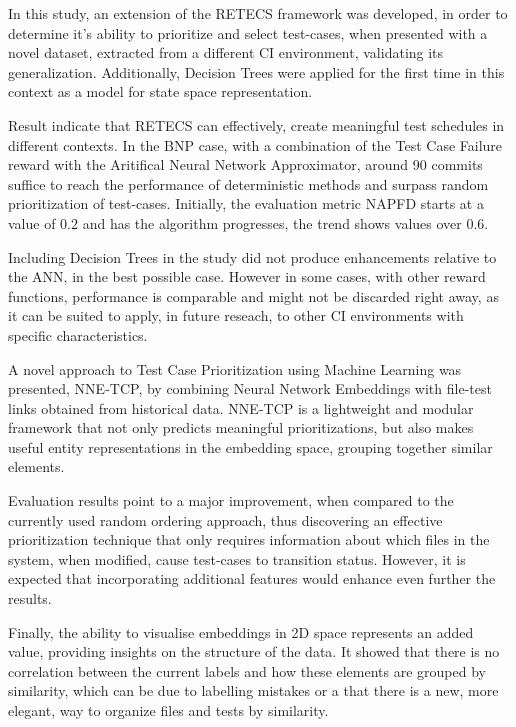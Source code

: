 In this study, an extension of the RETECS framework was developed, in order to determine it's ability to prioritize and select test-cases, when presented with a novel dataset, extracted from a different CI environment, validating its generalization. Additionally, Decision Trees were applied for the first time in this context as a model for state space representation. 
\par Result indicate that RETECS can effectively, create meaningful test schedules in different contexts. In the BNP case, with a combination of the Test Case Failure reward with the Aritifical Neural Network Approximator, around 90 commits suffice to reach the performance of deterministic methods and surpass random prioritization of test-cases. Initially, the evaluation metric NAPFD starts at a value of $0.2$ and has the algorithm progresses, the trend shows values over $0.6$. 
\par Including Decision Trees in the study did not produce enhancements relative to the ANN, in the best possible case. However in some cases, with other reward functions, performance is comparable and might not be discarded right away, as it can be suited to apply, in future reseach, to other CI environments with specific characteristics.
\par A novel approach to Test Case Prioritization using Machine Learning was presented, NNE-TCP, by combining Neural Network Embeddings with file-test links obtained from historical data. NNE-TCP is a lightweight and modular framework that not only predicts meaningful prioritizations, but also makes useful entity representations in the embedding space, grouping together similar elements.
\par Evaluation results point to a major improvement, when compared to the currently used random ordering approach, thus discovering an effective prioritization technique that only requires information about which files in the system, when modified, cause test-cases to transition status. However, it is expected that incorporating additional features would enhance even further the results. 
\par Finally, the ability to visualise embeddings in 2D space represents an added value, providing insights on the structure of the data. It showed that there is no correlation between the current labels and how these elements are grouped by similarity, which can be due to labelling mistakes or a that there is a new, more elegant, way to organize files and tests by similarity. 

